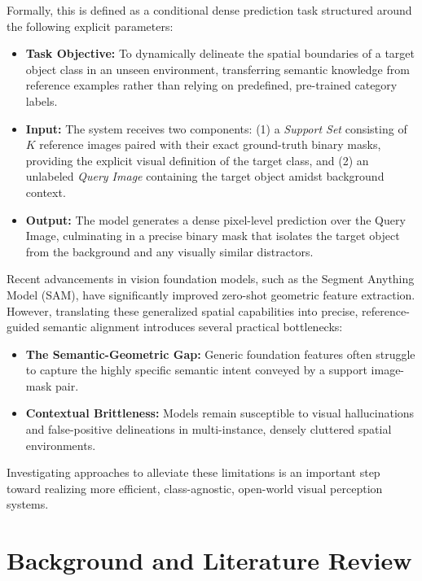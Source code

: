 \documentclass[journal,12pt,onecolumn,draftclsnofoot]{IEEEtran}
\begin{document}
Formally, this is defined as a conditional dense prediction task structured around the following explicit parameters:

\begin{itemize}[noitemsep, topsep=0pt]
    \item \textbf{Task Objective:} To dynamically delineate the spatial boundaries of a target object class in an unseen environment, transferring semantic knowledge from reference examples rather than relying on predefined, pre-trained category labels.

    \item \textbf{Input:} The system receives two components: (1) a \textit{Support Set} consisting of $K$ reference images paired with their exact ground-truth binary masks, providing the explicit visual definition of the target class, and (2) an unlabeled \textit{Query Image} containing the target object amidst background context.

    \item \textbf{Output:} The model generates a dense pixel-level prediction over the Query Image, culminating in a precise binary mask that isolates the target object from the background and any visually similar distractors.
\end{itemize}

Recent advancements in vision foundation models, such as the Segment Anything Model (SAM), have significantly improved zero-shot geometric feature extraction. However, translating these generalized spatial capabilities into precise, reference-guided semantic alignment introduces several practical bottlenecks:

\begin{itemize}[noitemsep, topsep=0pt]
    \item \textbf{The Semantic-Geometric Gap:} Generic foundation features often struggle to capture the highly specific semantic intent conveyed by a support image-mask pair.

    \item \textbf{Contextual Brittleness:} Models remain susceptible to visual hallucinations and false-positive delineations in multi-instance, densely cluttered spatial environments.
\end{itemize}

Investigating approaches to alleviate these limitations is an important step toward realizing more efficient, class-agnostic, open-world visual perception systems.

\section{Background and Literature Review}
\end{document}
